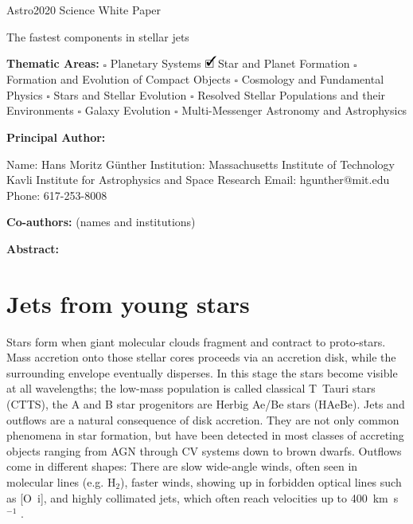 \documentclass[12pt]{article}
\newcommand{\cmark}{\ding{51}}%
\newcommand{\done}{\rlap{$\square$}{\raisebox{2pt}{\large\hspace{1pt}\cmark}}%
\hspace{-2.5pt}}
\begin{document}
\raggedright
\huge
Astro2020 Science White Paper \linebreak

The fastest components in stellar jets \linebreak
\normalsize

\noindent \textbf{Thematic Areas:} \hspace*{60pt} $\square$ Planetary Systems \hspace*{10pt} $\done$ Star and Planet Formation \hspace*{20pt}\linebreak
$\square$ Formation and Evolution of Compact Objects \hspace*{31pt} $\square$ Cosmology and Fundamental Physics \linebreak
  $\square$  Stars and Stellar Evolution \hspace*{1pt} $\square$ Resolved Stellar Populations and their Environments \hspace*{40pt} \linebreak
  $\square$    Galaxy Evolution   \hspace*{45pt} $\square$             Multi-Messenger Astronomy and Astrophysics \hspace*{65pt} \linebreak
  
\textbf{Principal Author:}

Name:	Hans Moritz G\"unther
 \linebreak						
Institution: Massachusetts Institute of Technology
Kavli Institute for Astrophysics and Space Research 
 \linebreak
Email: hgunther@mit.edu
 \linebreak
Phone:  617-253-8008
 \linebreak
 
\textbf{Co-authors:} (names and institutions)
  \linebreak

\textbf{Abstract:}


\pagebreak
\section{Jets from young stars}
Stars form when giant molecular clouds fragment and contract to
proto-stars. Mass accretion onto those stellar cores proceeds via an accretion
disk, while the surrounding envelope eventually disperses. In this stage the
stars become visible at all wavelengths; the low-mass population is called
classical T~Tauri stars (CTTS), the A and B star progenitors are Herbig Ae/Be
stars (HAeBe). Jets and outflows are a natural consequence of disk
accretion. They are not only common phenomena in star formation, but have been
detected in most classes of accreting objects ranging from AGN through CV
systems down to brown dwarfs. Outflows come in different shapes: There are slow
wide-angle winds, often seen in molecular lines (e.g. H$_2$), faster winds,
showing up in forbidden optical lines such as [O~{\sc i}], and highly collimated jets, which often reach velocities up to 400~km~s$^{-1}$ \citep{1998AJ....115.1554E}.
\end{document}
